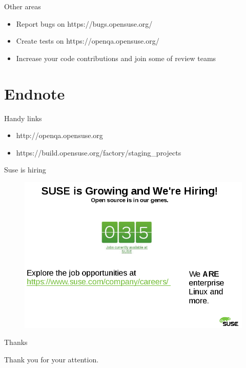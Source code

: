 \documentclass{beamer}
\begin{document}
\begin{frame}[t]{Other areas}
	\begin{itemize}
	\item Report bugs on https://bugs.opensuse.org/
	\item Create tests on https://openqa.opensuse.org/
	\item Increase your code contributions and join some of review teams
	\end{itemize}
\end{frame}

\section{Endnote}

\begin{frame}{Handy links}
	\begin{itemize}
	\item http://openqa.opensuse.org
	\item https://build.opensuse.org/factory/staging\_projects
	\end{itemize}
\end{frame}

\begin{frame}{Suse is hiring}
	\begin{figure}
	\includegraphics[width= 0.8\linewidth]{suse_hiring.png}
	\end{figure}
\end{frame}

\begin{frame}{Thanks}
	\begin{center}
	Thank you for your attention.
	\end{center}
\end{frame}
\end{document}

